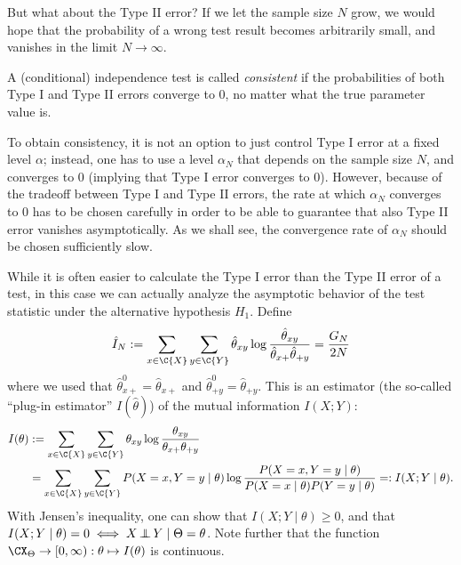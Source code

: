 But what about the Type II error? 
If we let the sample size $N$ grow, we would hope that the probability of a wrong test result becomes arbitrarily small, and
vanishes in the limit $N \to \infty$. 
\begin{Def}
A (conditional) independence test is called \emph{consistent} if the probabilities of both Type I and Type II errors converge to 0, no matter what the true parameter value is.
\end{Def}
To obtain consistency, it is not an option to just control Type I error at a fixed level $\alpha$; instead, one has to use a level $\alpha_N$
that depends on the sample size $N$, and converges to 0 (implying that Type I error converges to 0). However, because of the
tradeoff between Type I and Type II errors, the rate at which $\alpha_N$ converges to $0$ has to be chosen carefully in order to
be able to guarantee that also Type II error vanishes asymptotically. As we shall see, the convergence rate of $\alpha_N$ should be chosen
sufficiently slow.

While it is often easier to calculate the Type I error than the Type II error of
a test, in this case we can actually analyze the asymptotic behavior of the test statistic under the alternative hypothesis $H_1$.
Define
$$\hat I_N := \sum_{x\in\C{X}} \sum_{y\in\C{Y}} \hat \theta_{xy} \log \frac{\hat \theta_{xy}}{\hat \theta_{x+} \hat \theta_{+ y}}
    = \frac{G_N}{2N}$$
where we used that $\hat\theta^0_{x +} = \hat\theta_{x +}$ and $\hat\theta^0_{+ y} = \hat\theta_{+ y}$.
This is an estimator (the so-called ``plug-in estimator'' $I(\hat\theta)$) of the mutual information $I(X;Y)$:
\begin{equation*}\begin{split}
  I(\theta) & := \sum_{x\in\C{X}}\sum_{y\in\C{Y}} \theta_{xy} \log \frac{\theta_{xy}}{\theta_{x +} \theta_{+ y}} \\
  & = \sum_{x\in\C{X}} \sum_{y\in\C{Y}} P(X=x,Y=y \mid \theta) \log \frac{P(X=x,Y=y \mid \theta)}{P(X=x \mid \theta) P(Y=y \mid \theta)} =: I(X;Y \mid \theta).
\end{split}\end{equation*}
With Jensen's inequality, one can show that $I(X;Y \mid \theta) \ge 0$, and that $I(X;Y \mid \theta) = 0 \iff X \operatorname*{\perp\mkern-11mu\perp} Y \mid \Theta=\theta$.
Note further that the function $\CX_\Theta \to [0,\infty) : \theta \mapsto I(\theta)$ is continuous.

